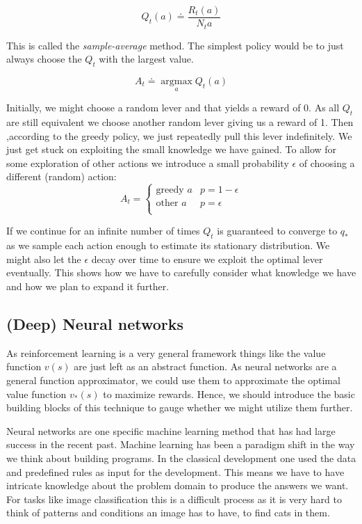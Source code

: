$$
    Q_t(a) \doteq \frac{R_t(a)}{N_t{a}}
$$

This is called the \textit{sample-average} method. The simplest policy would be to just always choose the $ Q_t $ with the largest value.

$$
    A_t \doteq \operatorname*{argmax}_a Q_t(a)
$$

Initially, we might choose a random lever and that yields a reward of 0. As all $ Q_t $ are still equivalent we choose another random lever giving us a reward of 1. Then ,according to the greedy policy, we just repeatedly pull this lever indefinitely. We just get stuck on exploiting the small knowledge we have gained. To allow for some exploration of other actions we introduce a small probability $\epsilon $ of choosing a different (random) action:
$$
    A_t =
    \begin{cases}
        \text{greedy } a & p = 1 - \epsilon \\
        \text{other } a  & p = \epsilon     \\
    \end{cases}
$$

If we continue for an infinite number of times $ Q_t $ is guaranteed to converge to $ q_{*} $ as we sample each action enough to estimate its stationary distribution. We might also let the $ \epsilon $ decay over time to ensure we exploit the optimal lever eventually. This shows how we have to carefully consider what knowledge we have and how we plan to expand it further.

\subsection{(Deep) Neural networks}
As reinforcement learning is a very general framework things like the value function $ v(s)$ are just left as an abstract function. As neural networks are a general function approximator, we could use them to approximate the optimal value function $ v_{*}(s) $ to maximize rewards. Hence, we should introduce the basic building blocks of this technique to gauge whether we might utilize them further.

Neural networks are one specific machine learning method that has had large success in the recent past. Machine learning has been a paradigm shift in the way we think about building programs. In the classical development one used the data and predefined rules as input for the development. This means we have to have intricate knowledge about the problem domain to produce the answers we want. For tasks like image classification this is a difficult process as it is very hard to think of patterns and conditions an image has to have, to find cats in them.

